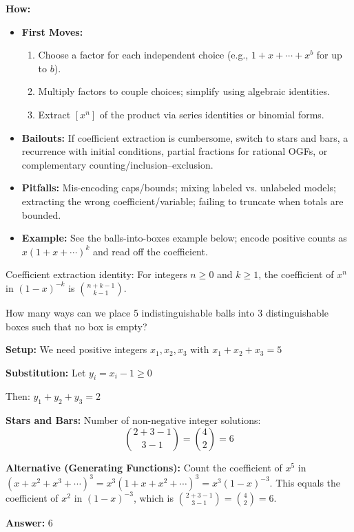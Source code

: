 \documentclass[12pt]{article}
\newenvironment{problem}[1]
{\begin{tcolorbox}[colback=blue!5!white,colframe=blue!75!black,title={#1}]}{\end{tcolorbox}}
\newenvironment{solution}
{\begin{tcolorbox}[colback=green!5!white,colframe=green!75!black,title={Solution}]}{\end{tcolorbox}}
\begin{document}
\textbf{How:}
\begin{itemize}
    \item \textbf{First Moves:}
    \begin{enumerate}[nosep]
        \item Choose a factor for each independent choice (e.g., $1+x+\cdots+x^b$ for up to $b$).
        \item Multiply factors to couple choices; simplify using algebraic identities.
        \item Extract $[x^n]$ of the product via series identities or binomial forms.
    \end{enumerate}
    \item \textbf{Bailouts:} If coefficient extraction is cumbersome, switch to stars and bars, a recurrence with initial conditions, partial fractions for rational OGFs, or complementary counting/inclusion–exclusion.
    \item \textbf{Pitfalls:} Mis-encoding caps/bounds; mixing labeled vs. unlabeled models; extracting the wrong coefficient/variable; failing to truncate when totals are bounded.
    \item \textbf{Example:} See the balls-into-boxes example below; encode positive counts as $x(1+x+\cdots)^k$ and read off the coefficient.
\end{itemize}

Coefficient extraction identity: For integers \(n \ge 0\) and \(k \ge 1\), the coefficient of \(x^n\) in \((1-x)^{-k}\) is \(\binom{n+k-1}{k-1}\).

\begin{problem}{AMC 12B 2020, Problem 18}
How many ways can we place 5 indistinguishable balls into 3 distinguishable boxes such that no box is empty?
\end{problem}

\begin{solution}
\textbf{Setup:} We need positive integers $x_1, x_2, x_3$ with $x_1 + x_2 + x_3 = 5$

\textbf{Substitution:} Let $y_i = x_i - 1 \geq 0$

Then: $y_1 + y_2 + y_3 = 2$

\textbf{Stars and Bars:} Number of non-negative integer solutions:
$$\binom{2+3-1}{3-1} = \binom{4}{2} = 6$$

\medskip

\textbf{Alternative (Generating Functions):} Count the coefficient of $x^5$ in $(x + x^2 + x^3 + \cdots)^3 = x^3(1 + x + x^2 + \cdots)^3 = x^3(1 - x)^{-3}$. This equals the coefficient of $x^2$ in $(1 - x)^{-3}$, which is $\binom{2 + 3 - 1}{3 - 1} = \binom{4}{2} = 6$.

\textbf{Answer:} $6$
\end{solution}
\end{document}
